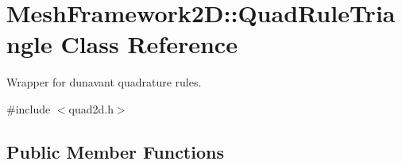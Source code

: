 \hypertarget{classMeshFramework2D_1_1QuadRuleTriangle}{}\section{Mesh\+Framework2D\+:\+:Quad\+Rule\+Triangle Class Reference}
\label{classMeshFramework2D_1_1QuadRuleTriangle}


Wrapper for dunavant quadrature rules.  




{\ttfamily \#include $<$quad2d.\+h$>$}

\subsection*{Public Member Functions}
